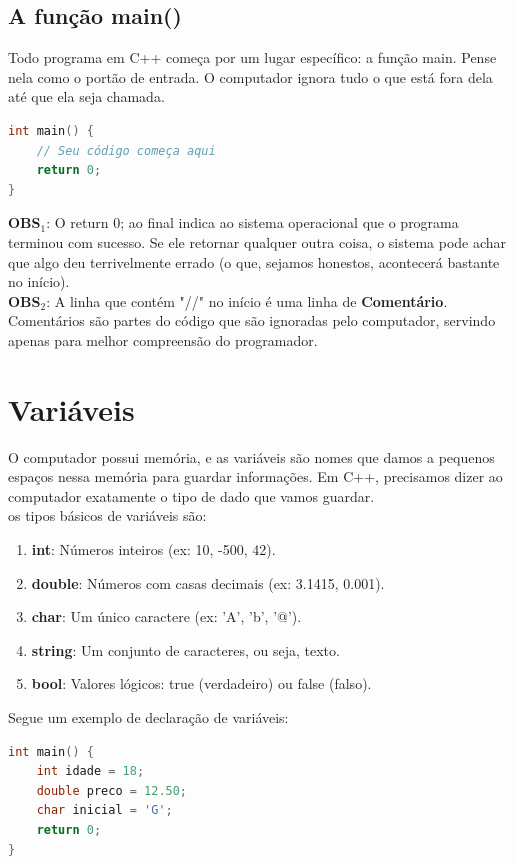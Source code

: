 \documentclass[12pt]{article}
\begin{document}
\subsection{A função main()}
Todo programa em C++ começa por um lugar específico: a função main. Pense nela como o portão de entrada. O computador ignora tudo o que está fora dela até que ela seja chamada.

\begin{lstlisting}[language=C++]
int main() {
    // Seu código começa aqui
    return 0; 
}
\end{lstlisting}

\textbf{OBS$_1$}: O return 0; ao final indica ao sistema operacional que o programa terminou com sucesso. Se ele retornar qualquer outra coisa, o sistema pode achar que algo deu terrivelmente errado (o que, sejamos honestos, acontecerá bastante no início).\\
\textbf{OBS$_2$}: A linha que contém "//" no início é uma linha de \textbf{Comentário}. Comentários são partes do código que são ignoradas pelo computador, servindo apenas para melhor compreensão do programador.



\section{Variáveis}
O computador possui memória, e as variáveis são nomes que damos a pequenos espaços nessa memória para guardar informações. Em C++, precisamos dizer ao computador exatamente o tipo de dado que vamos guardar.\\
os tipos básicos de variáveis são:
\begin{enumerate}
    \item \textbf{int}: Números inteiros (ex: 10, -500, 42).
    \item \textbf{double}: Números com casas decimais (ex: 3.1415, 0.001).
    \item \textbf{char}: Um único caractere (ex: 'A', 'b', '@').
    \item \textbf{string}: Um conjunto de caracteres, ou seja, texto.
    \item \textbf{bool}: Valores lógicos: true (verdadeiro) ou false (falso).
\end{enumerate}

Segue um exemplo de declaração de variáveis:
 \\
\begin{lstlisting}[language=C++]
int main() {
    int idade = 18;
    double preco = 12.50;
    char inicial = 'G';
    return 0; 
}
\end{lstlisting}
\end{document}
